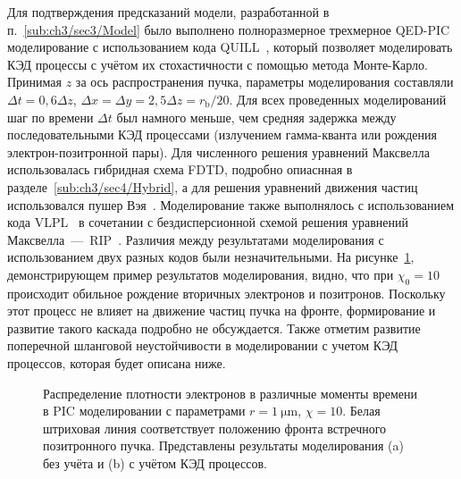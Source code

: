 Для подтверждения предсказаний модели, разработанной в п.~\ref{sub:ch3/sec3/Model} было выполнено полноразмерное трехмерное QED-PIC моделирование с использованием кода QUILL~\cite{QUILL}, который позволяет моделировать КЭД процессы с учётом их стохастичности с помощью метода Монте-Карло.
Принимая $z$ за ось распространения пучка, параметры моделирования составляли $\Delta t = 0,6 \Delta z$, $\Delta x = \Delta y = 2,5 \Delta z = r_\mathrm{b} / 20$.
Для всех проведенных моделирований шаг по времени $\Delta t$ был намного меньше, чем средняя задержка между последовательными КЭД процессами (излучением гамма-кванта или рождения электрон-позитронной пары).
Для численного решения уравнений Максвелла использовалась гибридная схема FDTD, подробно опиаснная в разделе~\ref{sub:ch3/sec4/Hybrid}, а для решения уравнений движения частиц использовался пушер Вэя~\cite{Vay08}.
Моделирование также выполнялось с использованием кода VLPL~\cite{pukhov1999three,NDFX,PhysRevE_94_063204} в сочетании с бездисперсионной схемой решения уравнений Максвелла~---~RIP~\cite{Pukhov2019}.
Различия между результатами моделирования с использованием двух разных кодов были незначительными.
На рисунке~\ref{fig:ch3/densities}, демонстрирующем пример результатов моделирования, видно, что при $\chi_0 = 10$ происходит обильное рождение вторичных электронов и позитронов.
Поскольку этот процесс не влияет на движение частиц пучка на фронте, формирование и развитие такого каскада подробно не обсуждается.
Также отметим развитие поперечной шланговой неустойчивости в моделировании с учетом КЭД процессов, которая будет описана ниже.

\begin{figure}[ht]
    \caption[Распределение плотности электронов в различные моменты времени в PIC моделировании столкновения электронного и позитронного пучков]{\label{fig:ch3/densities} 
    Распределение плотности электронов в различные моменты времени в PIC моделировании с параметрами $r = \SI{1}{\um}$, $\chi = 10$. 
    Белая штриховая линия соответствует положению фронта встречного позитронного пучка.
    Представлены результаты моделирования (a) без учёта и (b) с учётом КЭД процессов.}
\end{figure}

